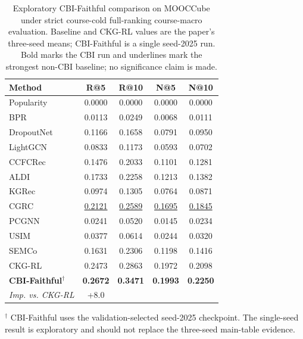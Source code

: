 \begin{table}[t]
\centering
{
\small
\setlength{\tabcolsep}{5.5pt}
\renewcommand{\arraystretch}{0.98}
\begin{tabular*}{\textwidth}{@{\extracolsep{\fill}}lcccc}
\toprule
Method & R@5 & R@10 & N@5 & N@10 \\
\midrule
Popularity & 0.0000 & 0.0000 & 0.0000 & 0.0000 \\
BPR & 0.0113 & 0.0249 & 0.0068 & 0.0111 \\
DropoutNet & 0.1166 & 0.1658 & 0.0791 & 0.0950 \\
LightGCN & 0.0833 & 0.1173 & 0.0593 & 0.0702 \\
CCFCRec & 0.1476 & 0.2033 & 0.1101 & 0.1281 \\
ALDI & 0.1733 & 0.2258 & 0.1213 & 0.1382 \\
KGRec & 0.0974 & 0.1305 & 0.0764 & 0.0871 \\
CGRC & \underline{0.2121} & \underline{0.2589} & \underline{0.1695} & \underline{0.1845} \\
PCGNN & 0.0241 & 0.0520 & 0.0145 & 0.0234 \\
USIM & 0.0377 & 0.0614 & 0.0244 & 0.0320 \\
SEMCo & 0.1631 & 0.2306 & 0.1198 & 0.1416 \\
CKG-RL & 0.2473 & 0.2863 & 0.1972 & 0.2098 \\
\textbf{CBI-Faithful}$^\dagger$ & \textbf{0.2672} & \textbf{0.3471} & \textbf{0.1993} & \textbf{0.2250} \\
\midrule
\emph{Imp. vs. CKG-RL} & +8.0%
\bottomrule
\end{tabular*}
}
\caption{Exploratory CBI-Faithful comparison on MOOCCube under strict course-cold full-ranking course-macro evaluation. Baseline and CKG-RL values are the paper's three-seed means; CBI-Faithful is a single seed-2025 run. Bold marks the CBI run and underlines mark the strongest non-CBI baseline; no significance claim is made.}
\label{tab:cbi-main-table-comparison}
\vspace{2pt}
\parbox{\textwidth}{\footnotesize $^\dagger$ CBI-Faithful uses the validation-selected seed-2025 checkpoint. The single-seed result is exploratory and should not replace the three-seed main-table evidence.}
\end{table}
